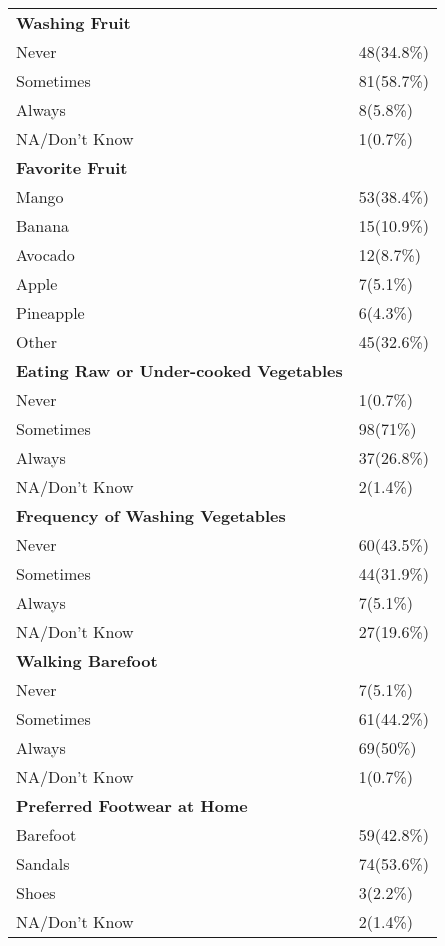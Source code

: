 \documentclass[10pt,letterpaper]{article}
\begin{document}
\begin{longtable}{ll}
\midrule
\textbf{Washing Fruit} & \\
Never & 48(34.8\%) \\
Sometimes & 81(58.7\%) \\
Always & 8(5.8\%) \\
NA/Don't Know & 1(0.7\%) \\
\midrule
\textbf{Favorite Fruit} & \\
Mango & 53(38.4\%) \\
Banana & 15(10.9\%) \\
Avocado & 12(8.7\%) \\
Apple & 7(5.1\%) \\
Pineapple & 6(4.3\%) \\
Other & 45(32.6\%) \\
\midrule
\textbf{Eating Raw or Under-cooked Vegetables} & \\
Never & 1(0.7\%) \\
Sometimes & 98(71\%) \\
Always & 37(26.8\%) \\
NA/Don't Know & 2(1.4\%) \\
\midrule
\textbf{Frequency of Washing Vegetables} & \\
Never & 60(43.5\%) \\
Sometimes & 44(31.9\%) \\
Always & 7(5.1\%) \\
NA/Don't Know & 27(19.6\%) \\
\midrule
\textbf{Walking Barefoot} & \\
Never & 7(5.1\%) \\
Sometimes & 61(44.2\%) \\
Always & 69(50\%) \\
NA/Don't Know & 1(0.7\%) \\
\midrule
\textbf{Preferred Footwear at Home} & \\
Barefoot & 59(42.8\%) \\
Sandals & 74(53.6\%) \\
Shoes & 3(2.2\%) \\
NA/Don't Know & 2(1.4\%) \\
\bottomrule
\end{longtable}
\end{document}
